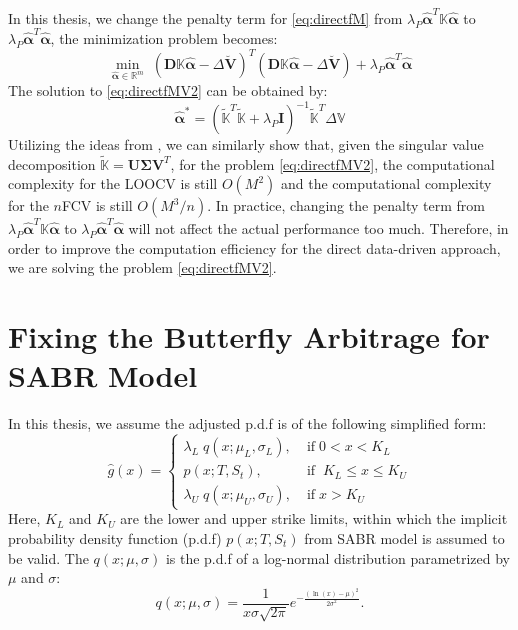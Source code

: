 \documentclass[letterpaper,12pt,titlepage,oneside,final]{book}
\numberwithin{equation}{section}
\theoremstyle{definition}
\newcommand{\Real}{\mathbb{R}}
\newcommand{\valpha}{\pmb{\widehat{\alpha}}}
\newcommand{\vK}{\mathbb{K}}
\newcommand{\vV}{\pmb{\breve{V}}}
\newcommand{\vecVmkt}{\mathbb{V}}
\begin{document}
In this thesis, we change the penalty term for \eqref{eq:directfM} from $\lambda_P \valpha^T\vK\valpha$ to $\lambda_P \valpha^T\valpha$, the minimization problem becomes:
\begin{equation}
\min_{\valpha \in \Real^m} \; ( \pmb{D} \vK \valpha - \Delta\vV)^T (\pmb{D}  \vK \valpha -\Delta\vV)+ \lambda_P \valpha^T\valpha
\label{eq:directfMV2}
\end{equation}
The solution to \eqref{eq:directfMV2} can be obtained by:
\[
\valpha^* = (\widetilde{\vK}^T\widetilde{\vK}  + \lambda_P \pmb{I})^{-1} \widetilde{\vK}^T \Delta \vecVmkt
\]
Utilizing the ideas from \cite{pahikkala2006fast, wahba1990spline}, we can similarly show that,  given the singular value decomposition ${\widetilde{\vK}}=\pmb{U} \pmb{\Sigma} \pmb{V}^T$, for the problem \eqref{eq:directfMV2},  the computational complexity for the LOOCV is still $O(M^2)$ and the computational complexity for the $n$FCV is still $O(M^3/n)$. In practice, changing the penalty term from $\lambda_P \valpha^T\vK\valpha$ to $\lambda_P \valpha^T\valpha$ will not affect the actual performance too much. Therefore, in order to improve the computation efficiency for the direct data-driven approach, we are solving the problem \eqref{eq:directfMV2}.



\chapter{Fixing the Butterfly Arbitrage for SABR Model}
\label{App:SABR Proof}
In this thesis, we assume the adjusted p.d.f is of the following simplified form:
\begin{equation}
\hat{g}(x)=\left\{ \begin{array}{ll }
\lambda_{L} \;  q(x;\mu_{L},\sigma_{L}), \;&  \text{if} \; 0<x< K_{L}\\
p(x;T,S_t) , \;&  \text{if} \; \;  K_{L} \leq x \leq K_{U}\\
\lambda_{U} \;  q(x;\mu_{U},\sigma_{U}), \;& \text{if} \; x> K_{U}
\end{array} \right.
\label{eq:AppOurFix}
\end{equation}
Here,  $K_{L}$ and $K_{U}$ are the lower and upper strike limits, within which the implicit probability density function (p.d.f) $p(x;T,S_t)$ from SABR model is assumed to be valid. The  $q(x;\mu,\sigma)$ is the p.d.f of a log-normal distribution parametrized by $\mu$ and $\sigma$:
\[
	q(x;\mu,\sigma)=\frac{1}{x\sigma \sqrt{2 \pi}}
	e^{-\frac{(\ln(x)-\mu)^2}{2 \sigma^2}}.
\]
\end{document}
